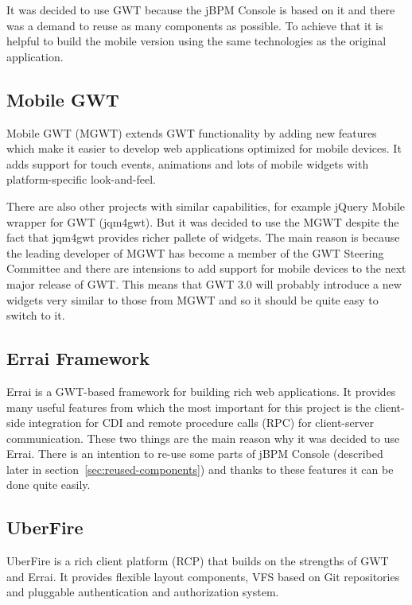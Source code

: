 \documentclass[12pt,oneside,final]{fithesis2}
\begin{document}
It was decided to use GWT because the jBPM Console is based on it and there was a demand to reuse as many components as possible.
To achieve that it is helpful to build the mobile version using the same technologies as the original application.

\subsection{Mobile GWT}
Mobile GWT (MGWT) extends GWT functionality by adding new features which make it easier to develop web applications optimized for mobile devices.
It adds support for touch events, animations and lots of mobile widgets with platform-specific look-and-feel.

There are also other projects with similar capabilities, for example jQuery Mobile wrapper for GWT\footnotemark{} (jqm4gwt).
But it was decided to use the MGWT despite the fact that jqm4gwt provides richer pallete of widgets.
The main reason is because the leading developer of MGWT has become a member of the GWT Steering Committee and there are intensions to add support for mobile devices to the next major release of GWT. \cite{gwtroadmap}
This means that GWT 3.0 will probably introduce a new widgets very similar to those from MGWT and so it should be quite easy to switch to it.

\subsection{Errai Framework}
Errai is a GWT-based framework for building rich web applications. \cite{erraidoc}
It provides many useful features from which the most important for this project is the client-side integration for CDI\footnotemark{} and remote procedure calls (RPC) for client-server communication.
These two things are the main reason why it was decided to use Errai.
There is an intention to re-use some parts of jBPM Console (described later in section~\ref{sec:reused-components}) and thanks to these features it can be done quite easily.

\subsection{UberFire}
UberFire is a rich client platform (RCP) that builds on the strengths of GWT and Errai. \cite{uberfire}
It provides flexible layout components, VFS based on Git repositories and pluggable authentication and authorization system.
\end{document}
